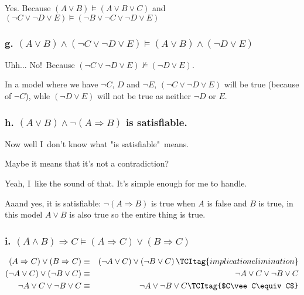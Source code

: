 \documentclass{article}
\begin{document}
Yes. Because $\left( A\vee B\right) \models \left( A\vee B\vee C\right) $
and $\left( \lnot C\vee \lnot D\vee E\right) \models \left( \lnot B\vee
\lnot C\vee \lnot D\vee E\right) $

\subsubsection{g. $\left( A\vee B\right) \wedge \left( \lnot C\vee \lnot
D\vee E\right) \models \left( A\vee B\right) \wedge \left( \lnot D\vee
E\right) $}

Uhh... No!\ Because $\left( \lnot C\vee \lnot D\vee E\right) \not\models
\left( \lnot D\vee E\right) $.

In a model where we have $\lnot C$, $D$ and $\lnot E$, $\left( \lnot C\vee
\lnot D\vee E\right) $ will be true (because of $\lnot C$), whle $\left(
\lnot D\vee E\right) $ will not be true as neither $\lnot D$ or $E$.

\subsubsection{h. $\left( A\vee B\right) \wedge \lnot \left( A\Rightarrow
B\right) $ is satisfiable.}

Now well I\ don't know what "is satisfiable"\ means.

Maybe it means that it's not a contradiction?

Yeah, I\ like the sound of that. It's simple enough for me to handle.

Aaand yes, it is satisfiable: $\lnot \left( A\Rightarrow B\right) $ is true
when $A$ is false and $B$ is true, in this model $A\vee B$ is also true so
the entire thing is true.

\subsubsection{i. $\left( A\wedge B\right) \Rightarrow C\models \left(
A\Rightarrow C\right) \vee \left( B\Rightarrow C\right) $}

\begin{eqnarray}
\left( A\Rightarrow C\right) \vee \left( B\Rightarrow C\right) &\equiv
&\left( \lnot A\vee C\right) \vee \left( \lnot B\vee C\right) 
\TCItag{implication elimination} \\
\left( \lnot A\vee C\right) \vee \left( \lnot B\vee C\right) &\equiv &\lnot
A\vee C\vee \lnot B\vee C  \nonumber \\
\lnot A\vee C\vee \lnot B\vee C &\equiv &\lnot A\vee \lnot B\vee C 
\TCItag{$C\vee C\equiv C$}
\end{eqnarray}
\end{document}
